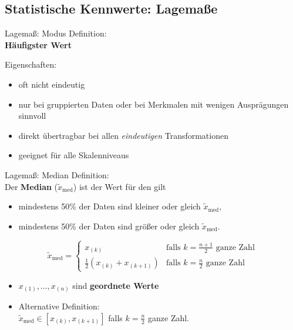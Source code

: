 \documentclass[
  10pt,
  ignorenonframetext,
]{beamer}
\providecommand{\tightlist}{%
  \setlength{\itemsep}{0pt}\setlength{\parskip}{0pt}}
\begin{document}
\hypertarget{statistische-kennwerte-lagemauxdfe}{%
\subsection{Statistische Kennwerte:
Lagemaße}\label{statistische-kennwerte-lagemauxdfe}}

\begin{frame}{Lagemaß: Modus}
\protect\hypertarget{lagemauxdf-modus}{}
Definition:\\
\textbf{Häufigster Wert}

Eigenschaften:

\begin{itemize}
\tightlist
\item
  oft nicht eindeutig
\item
  nur bei gruppierten Daten oder bei Merkmalen mit wenigen Ausprägungen
  sinnvoll
\item
  direkt übertragbar bei allen \emph{eindeutigen} Transformationen
\item
  geeignet für alle Skalenniveaus
\end{itemize}
\end{frame}

\begin{frame}{Lagemaß: Median}
\protect\hypertarget{lagemauxdf-median}{}
Definition:\\
Der \textbf{Median} (\(\tilde x_{\text{med}}\)) ist der Wert für den
gilt

\begin{itemize}
\tightlist
\item
  mindestens 50\% der Daten sind kleiner oder gleich
  \(\tilde x_{\text{med}}\),
\item
  mindestens 50\% der Daten sind größer oder gleich
  \(\tilde x_{\text{med}}\).
\end{itemize}

\begin{equation*}
 \tilde x_{\text{med}} = \left\{ \begin{array}{ll}
                                  x_{(k)} & \text{falls } k=\frac{n+1}{2}
\text{ ganze Zahl} \\
                                  \frac{1}{2} \left(x_{(k)} + x_{(k+1)}\right) &
\text{falls } k=\frac{n}{2} \text{ ganze Zahl}
                              \end{array}\right.
\end{equation*}

\begin{itemize}
\tightlist
\item
  \(x_{(1)},\ldots,x_{(n)}\) sind \textbf{geordnete Werte}
\item
  Alternative Definition:\\
  \(\tilde x_{\text{med}} \in [x_{(k)}, x_{(k+1)}]\) falls
  \(k = \frac{n}{2}\) ganze Zahl.
\end{itemize}
\end{frame}
\end{document}

